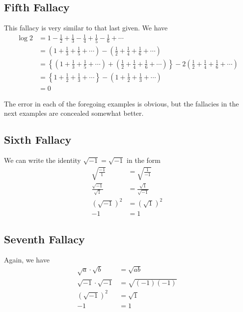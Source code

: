 \documentclass[paper=a4, fontsize=12pt]{scrartcl} %
\theoremstyle{definition}
\theoremstyle{remark}
\begin{document}
\subsection*{\textbf{Fifth Fallacy}} This fallacy is very similar to that last
given. We have
\begin{align*}
  \log 2 & = \textstyle 1 - \frac{1}{2} + \frac{1}{3} - \frac{1}{4} +
  \frac{1}{5} - \frac{1}{6}+\dotsb \\
         & = \textstyle \left( 1 + \frac{1}{3} + \frac{1}{5} + \dotsb\right) -
  \left( \frac{1}{2} + \frac{1}{4}  + \frac{1}{6}+\dotsb\right) \\
         & = \textstyle \left \{  \left( 1 + \frac{1}{3} + \frac{1}{5}  +
  \dotsb \right)
  + \left( \frac{1}{2} + \frac{1}{4} + \frac{1}{6} + \dotsb\right)
  \right\} - 2 \left( \frac{1}{2}  + \frac{1}{4} + \frac{1}{6} +
  \dotsb \right) \\
         & = \textstyle \left\{ 1 + \frac{1}{2} + \frac{1}{3} + \dotsb\right\}
  - \left( 1 + \frac{1}{2} + \frac{1}{3} + \dotsb\right) \\
         & =  0\,
\end{align*}

The error in each of the foregoing examples is obvious, but
the fallacies in the next examples are concealed somewhat
better.

\subsection*{\textbf{Sixth Fallacy}} We can write the identity $\sqrt{-1} = \sqrt{-1}$
in the form
%
\begin{align*}
  \sqrt{\frac{-1}{1}} & = \sqrt{\frac{1}{-1}}\,  \\
   \frac{\sqrt{-1}}{\sqrt{1}} & =  \frac{\sqrt{1}}{\sqrt{-1}} \, \\
 (\sqrt{-1})^2 & = (\sqrt{1})^2 \,  \\
 -1 & = 1 \,
\end{align*}

\subsection*{\textbf{Seventh Fallacy}} Again, we have
\begin{align*}
 \sqrt{a} \cdot \sqrt{b} & = \sqrt{ab} \,  \\
 \sqrt{-1} \cdot \sqrt{-1} & = \sqrt{(-1) (-1)} \,  \\
 (\sqrt{-1})^2 & =\sqrt{1} \,  \\
 -1 & = 1 \,
\end{align*}
\end{document}
